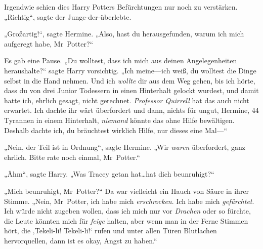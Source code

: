 Irgendwie schien dies Harry Potters Befürchtungen nur noch zu verstärken. „Richtig“, sagte der Junge-der-überlebte.

„Großartig!“, sagte Hermine. „Also, hast du herausgefunden, warum ich mich aufgeregt habe, Mr~Potter?“

Es gab eine Pause. „Du wolltest, dass ich mich aus deinen Angelegenheiten heraushalte?“ sagte Harry vorsichtig. „Ich meine—ich weiß, du wolltest die Dinge selbst in die Hand nehmen. Und ich \emph{wollte} dir aus dem Weg gehen, bis ich hörte, dass du von drei Junior Todessern in einen Hinterhalt gelockt wurdest, und damit hatte ich, ehrlich gesagt, nicht gerechnet. \emph{Professor Quirrell} hat das auch nicht erwartet. Ich dachte ihr wärt überfordert und dann, nichts für ungut, Hermine, 44 Tyrannen in einem Hinterhalt, \emph{niemand} könnte das ohne Hilfe bewältigen. Deshalb dachte ich, du bräuchtest wirklich Hilfe, nur dieses eine Mal—“

„Nein, der Teil ist in Ordnung“, sagte Hermine. „Wir \emph{waren} überfordert, ganz ehrlich. Bitte rate noch einmal, Mr~Potter.“

„Ähm“, sagte Harry. „Was Tracey getan hat…hat dich beunruhigt?“

„Mich beunruhigt, Mr~Potter?“ Da war vielleicht ein Hauch von Säure in ihrer Stimme. „Nein, Mr~Potter, ich habe mich \emph{erschrocken}. Ich habe mich \emph{gefürchtet}. Ich würde nicht zugeben wollen, dass ich mich nur vor \emph{Drachen} oder so fürchte, die Leute könnten mich für \emph{feige} halten, aber wenn man in der Ferne Stimmen hört, die ‚Tekeli-li! Tekeli-li!‘ rufen und unter allen Türen Blutlachen hervorquellen, dann ist es okay, Angst zu haben.“

